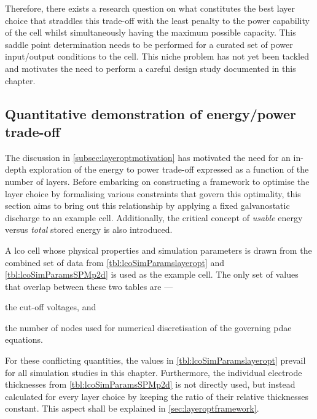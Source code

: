 
Therefore, there exists  a research question on what constitutes  the best layer
choice  that straddles  this  trade-off  with the  least  penalty  to the  power
capability  of  the  cell  whilst simultaneously  having  the  maximum  possible
capacity. This  saddle point determination needs  to be performed for  a curated
set of power input/output conditions to the cell. This niche problem has not yet
been tackled and motivates the need to perform a careful design study documented
in this chapter.

\subsection{Quantitative demonstration of energy/power trade-off}\label{sec:energypowertradeoffdemo}

The discussion in \cref{subsec:layeroptmotivation} has motivated the need for an
in-depth exploration  of the energy to  power trade-off expressed as  a function
of  the number  of  layers.  Before embarking  on  constructing  a framework  to
optimise the  layer choice by  formalising various constraints that  govern this
optimality, this section aims to bring out this relationship by applying a fixed
galvanostatic discharge to  an example cell. Additionally,  the critical concept
of \emph{usable} energy versus \emph{total} stored energy is also introduced.

A  \gls{lco}  cell  whose  physical  properties  and  simulation  parameters  is
drawn from  the combined  set of  data from  \cref{tbl:lcoSimParamslayeropt} and
\cref{tbl:lcoSimParamsSPMp2d}  is used  as the  example  cell. The  only set  of
values that overlap between these two tables are ---
\begin{enumerate*}[label=\itshape\alph*\upshape)]
    \item the cut-off voltages, and
    \item the number of nodes  used for numerical  discretisation of  the governing  \gls{pdae} equations.
\end{enumerate*}
For these conflicting quantities,  the values in \cref{tbl:lcoSimParamslayeropt}
prevail for all simulation studies  in this chapter. Furthermore, the individual
electrode thicknesses  from \cref{tbl:lcoSimParamsSPMp2d} is not  directly used,
but  instead  calculated  for  every  layer  choice  by  keeping  the  ratio  of
their  relative  thicknesses  constant.  This   aspect  shall  be  explained  in
\cref{sec:layeroptframework}.

